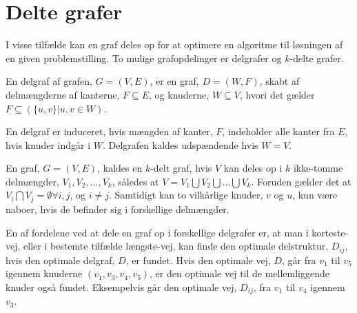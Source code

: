 \section{Delte grafer}
I visse tilfælde kan en graf deles op for at optimere en algoritme til løsningen af en given problemstilling.
To mulige grafopdelinger er delgrafer og $k$-delte grafer.

\begin{defn}[Delgraf] \label{defn:delgraf} %
En delgraf af grafen, $G= (V,E)$, er en graf, $D = (W,F)$, skabt af delmængderne af kanterne, $F \subseteq E$, og knuderne, $W \subseteq V$, hvori det gælder $F \subseteq (\{u,v\} | u,v \in W)$.
\end{defn}

En delgraf er induceret, hvis mængden af kanter, $F$, indeholder alle kanter fra $E$, hvis knuder indgår i $W$.
Delgrafen kaldes udspændende hvis $W=V$. 

\begin{defn} \label{defn:k-delt} %
En graf, $G = (V, E)$, kaldes en $k$-delt graf, hvis $V$ kan deles op i $k$ ikke-tomme delmængder, $V_1, V_2,\dotsc, V_k$, således at $V= V_1 \bigcup V_2 \bigcup \dotsc \bigcup V_k$. Foruden gælder det at $V_i \bigcap V_j  = \emptyset \forall i,j$, og $i\neq j$. Samtidigt kan to vilkårlige knuder, $v$ og $u$, kun være naboer, hvis de befinder sig i forskellige delmængder. 
\end{defn}

En af fordelene ved at dele en graf op i forskellige delgrafer er, at man i korteste-vej, eller i bestemte tilfælde længste-vej, kan finde den optimale delstruktur, $D_{ij}$, hvis den optimale delgraf, $D$, er fundet. Hvis den optimale vej, $D$, går fra $v_1$ til $v_5$ igennem knuderne $(v_1, v_3, v_4, v_5)$, er den optimale vej til de mellemliggende knuder også fundet. Eksempelvis går den optimale vej, $D_{ij}$, fra $v_1$ til $v_4$ igennem $v_3$.


